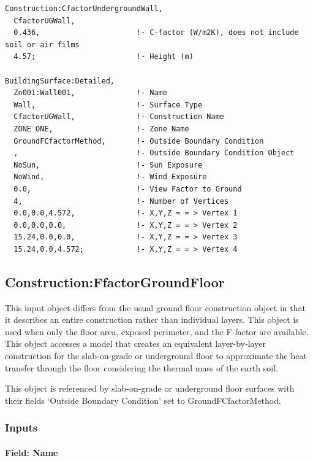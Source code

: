 \begin{lstlisting}
Construction:CfactorUndergroundWall,
  CfactorUGWall,
  0.436,                      !- C-factor (W/m2K), does not include soil or air films
  4.57;                       !- Height (m)

BuildingSurface:Detailed,
  Zn001:Wall001,              !- Name
  Wall,                       !- Surface Type
  CfactorUGWall,              !- Construction Name
  ZONE ONE,                   !- Zone Name
  GroundFCfactorMethod,       !- Outside Boundary Condition
  ,                           !- Outside Boundary Condition Object
  NoSun,                      !- Sun Exposure
  NoWind,                     !- Wind Exposure
  0.0,                        !- View Factor to Ground
  4,                          !- Number of Vertices
  0.0,0.0,4.572,              !- X,Y,Z = = > Vertex 1
  0.0,0.0,0.0,                !- X,Y,Z = = > Vertex 2
  15.24,0.0,0.0,              !- X,Y,Z = = > Vertex 3
  15.24,0.0,4.572;            !- X,Y,Z = = > Vertex 4
\end{lstlisting}

\subsection{Construction:FfactorGroundFloor}\label{constructionffactorgroundfloor}

This input object differs from the usual ground floor construction object in that it describes an entire construction rather than individual layers. This object is used when only the floor area, exposed perimeter, and the F-factor are available.~ This object accesses a model that creates an equivalent layer-by-layer construction for the slab-on-grade or underground floor to approximate the heat transfer through the floor considering the thermal mass of the earth soil.

This object is referenced by slab-on-grade or underground floor surfaces with their fields `Outside Boundary Condition' set to GroundFCfactorMethod.

\subsubsection{Inputs}\label{inputs-37}

\paragraph{Field: Name}\label{field-name-30-000}

